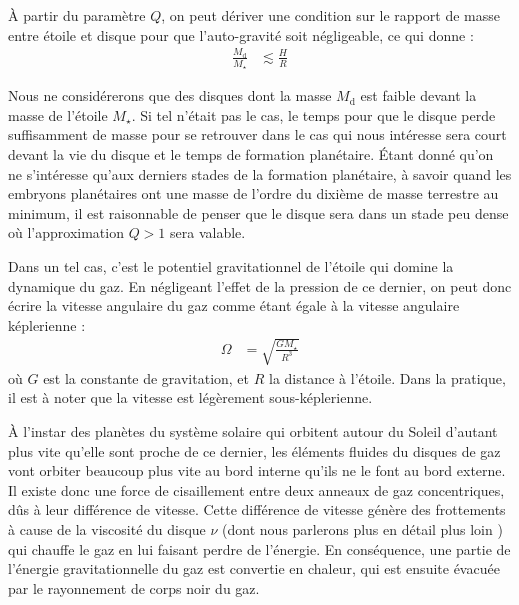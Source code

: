 
À partir du paramètre $Q$, on peut dériver une condition sur le rapport de masse entre étoile et disque pour que l'auto-gravité soit négligeable, ce qui donne \citep{gammie2001nonlinear} : 
\begin{align}
\frac{M_\text{d}}{M_\star} &\lesssim \frac{H}{R}
\end{align}

Nous ne considérerons que des disques dont la masse $M_\text{d}$ est faible devant la masse de l'étoile $M_\star$. Si tel n'était pas le cas, le temps pour que le disque perde suffisamment de masse pour se retrouver dans le cas qui nous intéresse sera court devant la vie du disque et le temps de formation planétaire. Étant donné qu'on ne s'intéresse qu'aux derniers stades de la formation planétaire, à savoir quand les embryons planétaires ont une masse de l'ordre du dixième de masse terrestre au minimum, il est raisonnable de penser que le disque sera dans un stade peu dense où l'approximation $Q>1$ sera valable.

Dans un tel cas, c'est le potentiel gravitationnel de l'étoile qui domine la dynamique du gaz. En négligeant l'effet de la pression de ce dernier, on peut donc écrire la vitesse angulaire du gaz comme étant égale à la vitesse angulaire képlerienne : 
\begin{align}
\Omega &= \sqrt{\frac{GM_\star}{R^3}}
\end{align}
où $G$ est la constante de gravitation, et $R$ la distance à l'étoile. Dans la pratique, il est à noter que la vitesse est légèrement sous-képlerienne. 

\bigskip

À l'instar des planètes du système solaire qui orbitent autour du Soleil d'autant plus vite qu'elle sont proche de ce dernier, les éléments fluides du disques de gaz vont orbiter beaucoup plus vite au bord interne qu'ils ne le font au bord externe. Il existe donc une force de cisaillement entre deux anneaux de gaz concentriques, dûs à leur différence de vitesse. Cette différence de vitesse génère des frottements à cause de la viscosité du disque $\nu$ (dont nous parlerons plus en détail plus loin ) qui chauffe le gaz en lui faisant perdre de l'énergie. En conséquence, une partie de l'énergie gravitationnelle du gaz est convertie en chaleur, qui est ensuite évacuée par le rayonnement de corps noir du gaz. 

